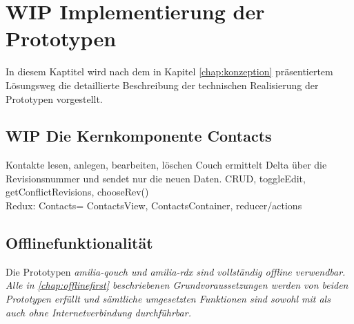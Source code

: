 \chapter{\label{chap:implementierung}WIP Implementierung der Prototypen}
In diesem Kaptitel wird nach dem in Kapitel \ref{chap:konzeption} präsentiertem Lösungsweg die detaillierte Beschreibung der technischen Realisierung der Prototypen vorgestellt.\\
%
%
%
\section{WIP Die Kernkomponente Contacts}

Kontakte lesen, anlegen, bearbeiten, löschen
Couch ermittelt Delta über die Revisionsnummer und sendet nur die neuen Daten.
CRUD, toggleEdit, getConflictRevisions, chooseRev()\\
Redux: Contacts= ContactsView, ContactsContainer, reducer/actions
%
%
%
\section{Offlinefunktionalität}
Die Prototypen \it{amilia-qouch} und \it{amilia-rdx} sind vollständig offline verwendbar.
Alle in \autoref{chap:offlinefirst} beschriebenen Grundvoraussetzungen werden von beiden Prototypen erfüllt und sämtliche umgesetzten Funktionen sind sowohl mit als auch ohne Internetverbindung durchführbar.
%

%
%
%
